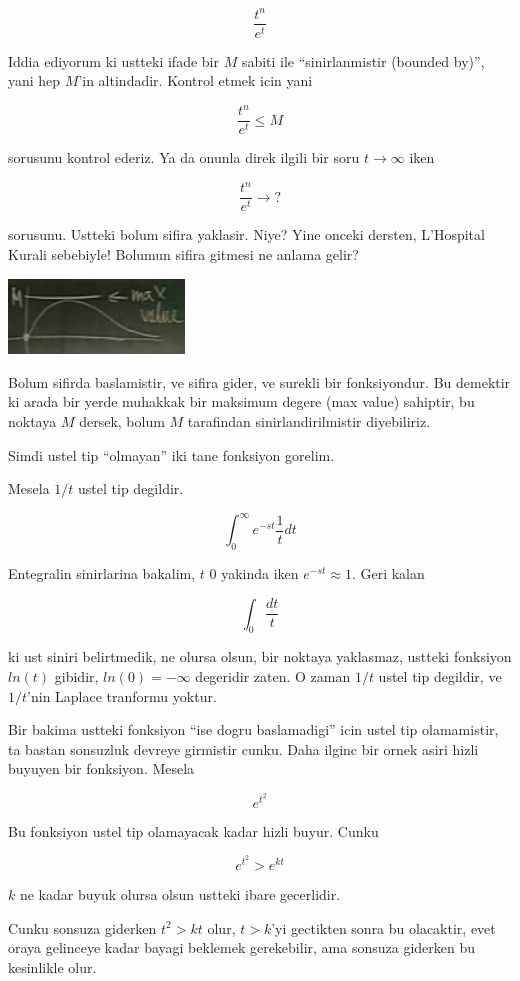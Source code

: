 \documentclass[12pt,fleqn]{article}\usepackage{../common}
\begin{document}
\[ \frac{t^n}{e^t} \]

Iddia ediyorum ki ustteki ifade bir $M$ sabiti ile ``sinirlanmistir
(bounded by)'', yani hep $M$'in altindadir. Kontrol etmek icin yani

\[ \frac{t^n}{e^t} \le  M\]

sorusunu kontrol ederiz. Ya da onunla direk ilgili bir soru  $t \to \infty$ iken

\[ \frac{t^n}{e^t} \to ?\]

sorusunu. Ustteki bolum sifira yaklasir. Niye? Yine onceki dersten,
L'Hospital Kurali sebebiyle! Bolumun sifira gitmesi ne anlama gelir? 

\includegraphics[height=2cm]{20_1.png}

Bolum sifirda baslamistir, ve sifira gider, ve surekli bir fonksiyondur. Bu
demektir ki arada bir yerde muhakkak bir maksimum degere (max value)
sahiptir, bu noktaya $M$ dersek, bolum $M$ tarafindan sinirlandirilmistir
diyebiliriz.

Simdi ustel tip ``olmayan'' iki tane fonksiyon gorelim. 

Mesela $1/t$ ustel tip degildir. 

\[ \int_0^{\infty} e^{-st}\frac{1}{t} dt  \]

Entegralin sinirlarina bakalim, $t$ 0 yakinda iken $e^{-st} \approx
1$. Geri kalan

\[ \int_0 \frac{dt}{t} \]

ki ust siniri belirtmedik, ne olursa olsun, bir noktaya yaklasmaz, ustteki
fonksiyon $ln(t)$ gibidir, $ln(0)=-\infty$ degeridir zaten. O zaman $1/t$
ustel tip degildir, ve $1/t$'nin Laplace tranformu yoktur. 

Bir bakima ustteki fonksiyon ``ise dogru baslamadigi'' icin ustel tip
olamamistir, ta bastan sonsuzluk devreye girmistir cunku. Daha ilginc bir
ornek asiri hizli buyuyen bir fonksiyon. Mesela

\[ e^{t^2} \]

Bu fonksiyon ustel tip olamayacak kadar hizli buyur. Cunku 

\[ e^{t^2} > e^{kt} \]

$k$ ne kadar buyuk olursa olsun ustteki ibare gecerlidir. 

Cunku sonsuza giderken $t^2 > kt$ olur, $t>k$'yi gectikten sonra bu
olacaktir, evet oraya gelinceye kadar bayagi beklemek gerekebilir, ama
sonsuza giderken bu kesinlikle olur.
\end{document}
